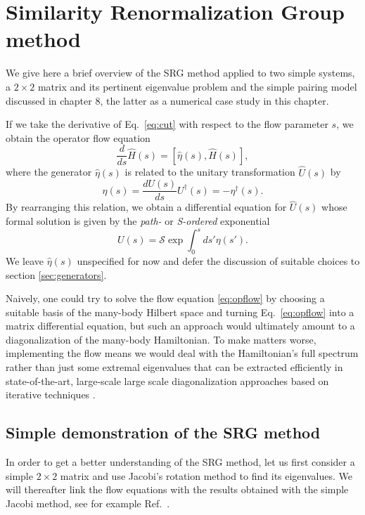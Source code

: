 \section{Similarity Renormalization Group method}

We give here a brief overview of the SRG method applied to two simple systems,  a $2\times 2$ matrix and its pertinent eigenvalue problem and the simple pairing model discussed in chapter 8, the latter as a numerical case study in this chapter. 

If we take the derivative of Eq.~\eqref{eq:cut}
with respect to the flow parameter $s$, we obtain the operator flow equation
\begin{equation}\label{eq:opflow}
  \frac{d}{ds}\hat{H}(s) = [\hat{\eta}(s),\hat{H}(s)],
\end{equation} 
where the generator $\hat{\eta}(s)$ is related to the unitary transformation $\hat{U}(s)$ by
\begin{equation}
  \eta(s)=\frac{dU(s)}{ds}U^{\dag}(s) = -\eta^{\dag}(s).
\end{equation}
By rearranging this relation, we obtain a differential equation for $\hat{U}(s)$ whose formal solution is given by the \emph{path-}
or \emph{S-ordered} exponential
\begin{equation}
  U(s) = \mathcal{S}\exp \int^s_0 ds' \eta(s').
\end{equation}
We leave $\hat{\eta}(s)$ unspecified for now and defer the discussion of suitable choices to section \ref{sec:generators}. 

Naively, one could try to solve the flow equation \eqref{eq:opflow} by
choosing a suitable basis of the many-body Hilbert space and turning
Eq.~\eqref{eq:opflow} into a matrix differential equation, but such an
approach would ultimately amount to a diagonalization of the many-body
Hamiltonian. To make matters worse, implementing the flow means we
would deal with the Hamiltonian's full spectrum rather than just some
extremal eigenvalues that can be extracted efficiently in
state-of-the-art, large-scale large scale diagonalization approaches based on iterative techniques
\cite{golubvaloan1996}.

\subsection{Simple demonstration of the SRG method}
In order to get a better understanding of the SRG method, let us first consider  
a simple $2\times 2$ matrix and use Jacobi's rotation method to find its eigenvalues. 
We will thereafter link the flow equations
with the results obtained with the simple Jacobi method, see for example Ref.~\cite{golubvanloan1996}.


